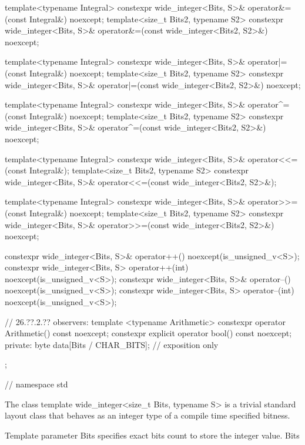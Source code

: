\begin{codeblock}
{{    template<typename Integral>
      constexpr wide_integer<Bits, S>& operator&=(const Integral&) noexcept;
    template<size_t Bits2, typename S2>
      constexpr wide_integer<Bits, S>& operator&=(const wide_integer<Bits2, S2>&) noexcept;
    
    template<typename Integral>
      constexpr wide_integer<Bits, S>& operator|=(const Integral&) noexcept;
    template<size_t Bits2, typename S2>
      constexpr wide_integer<Bits, S>& operator|=(const wide_integer<Bits2, S2>&) noexcept;
    
    template<typename Integral>
      constexpr wide_integer<Bits, S>& operator^=(const Integral&) noexcept;
    template<size_t Bits2, typename S2>
      constexpr wide_integer<Bits, S>& operator^=(const wide_integer<Bits2, S2>&) noexcept;
    
    template<typename Integral>
      constexpr wide_integer<Bits, S>& operator<<=(const Integral&);
    template<size_t Bits2, typename S2>
      constexpr wide_integer<Bits, S>& operator<<=(const wide_integer<Bits2, S2>&);
    
    template<typename Integral>
      constexpr wide_integer<Bits, S>& operator>>=(const Integral&) noexcept;
    template<size_t Bits2, typename S2>
      constexpr wide_integer<Bits, S>& operator>>=(const wide_integer<Bits2, S2>&) noexcept;
    
    constexpr wide_integer<Bits, S>& operator++() noexcept(is_unsigned_v<S>);
    constexpr wide_integer<Bits, S> operator++(int) noexcept(is_unsigned_v<S>);
    constexpr wide_integer<Bits, S>& operator--() noexcept(is_unsigned_v<S>);
    constexpr wide_integer<Bits, S> operator--(int) noexcept(is_unsigned_v<S>);
    
    // 26.??.2.?? observers:
    template <typename Arithmetic> constexpr operator Arithmetic() const noexcept;
      constexpr explicit operator bool() const noexcept;
  private:
    byte data[Bits / CHAR_BITS]; // exposition only
  };
} // namespace std
\end{codeblock}

The class template wide_integer<size_t Bits, typename S> is a trivial standard layout class that behaves as an integer type of a compile time specified bitness.

Template parameter Bits specifies exact bits count to store the integer value. Bits %

